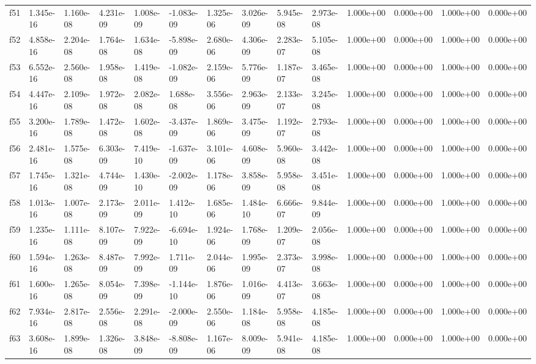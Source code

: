\begin{table}
\begin{tabular}{llllllllllllll}
f51 & 1.345e-16 & 1.160e-08 & 4.231e-09 & 1.008e-09 & -1.083e-09 & 1.325e-06 & 3.026e-09 & 5.945e-08 & 2.973e-08 & 1.000e+00 & 0.000e+00 & 1.000e+00 & 0.000e+00 \\
f52 & 4.858e-16 & 2.204e-08 & 1.764e-08 & 1.634e-08 & -5.898e-09 & 2.680e-06 & 4.306e-09 & 2.283e-07 & 5.105e-08 & 1.000e+00 & 0.000e+00 & 1.000e+00 & 0.000e+00 \\
f53 & 6.552e-16 & 2.560e-08 & 1.958e-08 & 1.419e-08 & -1.082e-09 & 2.159e-06 & 5.776e-09 & 1.187e-07 & 3.465e-08 & 1.000e+00 & 0.000e+00 & 1.000e+00 & 0.000e+00 \\
f54 & 4.447e-16 & 2.109e-08 & 1.972e-08 & 2.082e-08 & 1.688e-08 & 3.556e-06 & 2.963e-09 & 2.133e-07 & 3.245e-08 & 1.000e+00 & 0.000e+00 & 1.000e+00 & 0.000e+00 \\
f55 & 3.200e-16 & 1.789e-08 & 1.472e-08 & 1.602e-08 & -3.437e-09 & 1.869e-06 & 3.475e-09 & 1.192e-07 & 2.793e-08 & 1.000e+00 & 0.000e+00 & 1.000e+00 & 0.000e+00 \\
f56 & 2.481e-16 & 1.575e-08 & 6.303e-09 & 7.419e-10 & -1.637e-09 & 3.101e-06 & 4.608e-09 & 5.960e-08 & 3.442e-08 & 1.000e+00 & 0.000e+00 & 1.000e+00 & 0.000e+00 \\
f57 & 1.745e-16 & 1.321e-08 & 4.744e-09 & 1.430e-10 & -2.002e-09 & 1.178e-06 & 3.858e-09 & 5.958e-08 & 3.451e-08 & 1.000e+00 & 0.000e+00 & 1.000e+00 & 0.000e+00 \\
f58 & 1.013e-16 & 1.007e-08 & 2.173e-09 & 2.011e-09 & 1.412e-10 & 1.685e-06 & 1.484e-10 & 6.666e-07 & 9.844e-09 & 1.000e+00 & 0.000e+00 & 1.000e+00 & 0.000e+00 \\
f59 & 1.235e-16 & 1.111e-08 & 8.107e-09 & 7.922e-09 & -6.694e-10 & 1.924e-06 & 1.768e-09 & 1.209e-07 & 2.056e-08 & 1.000e+00 & 0.000e+00 & 1.000e+00 & 0.000e+00 \\
f60 & 1.594e-16 & 1.263e-08 & 8.487e-09 & 7.992e-09 & 1.711e-09 & 2.044e-06 & 1.995e-09 & 2.373e-07 & 3.998e-08 & 1.000e+00 & 0.000e+00 & 1.000e+00 & 0.000e+00 \\
f61 & 1.600e-16 & 1.265e-08 & 8.054e-09 & 7.398e-09 & -1.144e-10 & 1.876e-06 & 1.016e-09 & 4.413e-07 & 3.663e-08 & 1.000e+00 & 0.000e+00 & 1.000e+00 & 0.000e+00 \\
f62 & 7.934e-16 & 2.817e-08 & 2.556e-08 & 2.291e-08 & -2.000e-09 & 2.550e-06 & 1.184e-08 & 5.958e-08 & 4.185e-08 & 1.000e+00 & 0.000e+00 & 1.000e+00 & 0.000e+00 \\
f63 & 3.608e-16 & 1.899e-08 & 1.326e-08 & 3.848e-09 & -8.808e-09 & 1.167e-06 & 8.009e-09 & 5.941e-08 & 4.185e-08 & 1.000e+00 & 0.000e+00 & 1.000e+00 & 0.000e+00 \\

\end{tabular}
\end{table}
